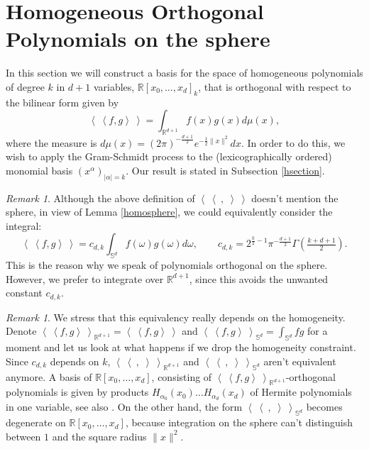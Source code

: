 \documentclass{amsart}
\newcommand{\bra}{\left<\!\!\!\:\left<}
\newcommand{\ket}{\right>\!\!\!\:\right>}
\newcommand{\R}{\mathbb{R}}
\renewcommand{\S}{\mathbb{S}}
\theoremstyle{plain}
\theoremstyle{definition}
\theoremstyle{remark}
\newtheorem{remark}[theorem]{Remark}
\begin{document}
\section{Homogeneous Orthogonal Polynomials on the sphere} \label{polynomialSection}
In this section we will construct a basis for the space of homogeneous polynomials of degree $k$ in $d+1$ variables, $\R[x_0,\ldots,x_d]_k$, that is orthogonal with respect to the bilinear form given by
\begin{equation} \label{spherebracket}
 \bra f,g\ket = \int_{\R^{d+1}}f(x)g(x) d\mu(x),
\end{equation}
where the measure is $d\mu(x) = (2\pi)^{-\frac{d+1}{2}}e^{-\frac{1}{2}\|x\|^2}dx$. In order to do this, we wish to apply the Gram-Schmidt process to the (lexicographically ordered) monomial basis $(x^\alpha)_{|\alpha |=k}$. Our result is stated in Subsection \ref{hsection}. 
\begin{remark}
Although the above definition of $\bra\ ,\;\ket$ doesn't mention the sphere, in view of Lemma \ref{homosphere}, we could equivalently consider the integral:
$$
 \bra f,g\ket = c_{d,k} \int_{\S^{d}}f(\omega)g(\omega) d\omega, \qquad c_{d,k} = 2^{\frac{k}{2}-1}\pi^{-\frac{d+1}{2}}\Gamma\!\left(\tfrac{k+d+1}{2}\right).
$$ 
This is the reason why we speak of polynomials orthogonal on the sphere. However, we prefer to integrate over $\R^{d+1}$, since this avoids the unwanted constant $c_{d,k}$.
\end{remark}

\begin{remark}\label{hermite}
We stress that this equivalency really depends on the homogeneity. Denote $\bra f ,g\ket_{\R^{d+1}} = \bra f,g\ket$ and $\bra f ,g\ket_{\S^{d}}=\int_{\S^{d}} f g$ for a moment and let us look at what happens if we drop the homogeneity constraint. Since $c_{d,k}$ depends on $k$, $\bra\ ,\;\ket_{\R^{d+1}}$ and $\bra\ ,\;\ket_{\S^d}$ aren't equivalent anymore. A basis of $\R[x_0,\ldots,x_d]$, consisting of $\bra f ,g\ket_{\R^{d+1}}$-orthogonal polynomials is given by products $H_{\alpha_0}\!(x_0)\ldots H_{\alpha_d}\!(x_d)$ of Hermite polynomials in one variable, see also \cite[Sect.~2.3.4]{Dunkl}. On the other hand, the form $\bra\ ,\;\ket_{\S^d}$ becomes degenerate on $\R[x_0,\ldots,x_d]$, because integration on the sphere can't distinguish between $1$ and the square radius $\|x\|^2$. 
\end{remark}
\end{document}
